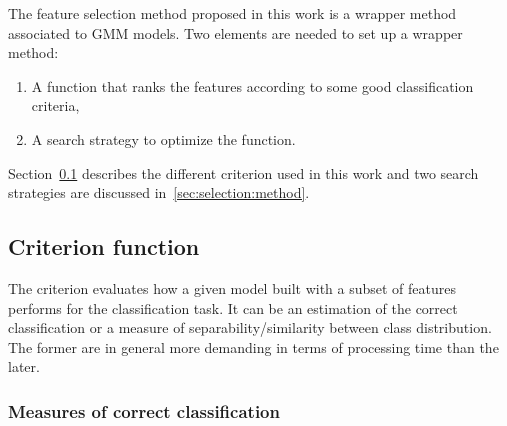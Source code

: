 \documentclass[journal,peerreview,onecolumn]{IEEEtran}
\begin{document}
The feature selection method proposed in this work is a wrapper method associated to GMM models. Two elements are needed to set up a wrapper method:
\begin{enumerate}
\item A function that  ranks the features according to some good classification criteria,
\item A search strategy to optimize the function.
\end{enumerate}

Section~\ref{sec:criterion} describes the different criterion used in this work and two search strategies are discussed in~\ref{sec:selection:method}.


    \subsection{Criterion function}
    \label{sec:criterion}
    The criterion evaluates how a given model built with a subset of features performs for the classification task. It can be an estimation of the correct classification or a measure of separability/similarity between class distribution. The former are in general more demanding in terms of processing time than the later.
    

        \subsubsection{Measures of correct classification}
        \label{sec:criterion-rate}
\end{document}
